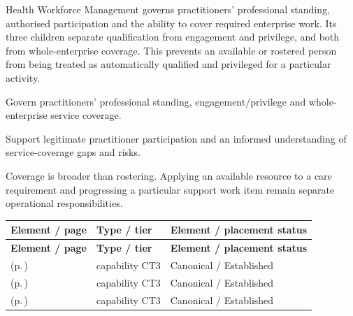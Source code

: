 Health Workforce Management governs practitioners' professional standing, authorised participation and the ability to cover required enterprise work. Its three children separate qualification from engagement and privilege, and both from whole-enterprise coverage. This prevents an available or rostered person from being treated as automatically qualified and privileged for a particular activity.



Govern practitioners’ professional standing, engagement/\allowbreak{}privilege and whole-enterprise service coverage.



Support legitimate practitioner participation and an informed understanding of service-coverage gaps and risks.



Coverage is broader than rostering. Applying an available resource to a care requirement and progressing a particular support work item remain separate operational responsibilities.


\begingroup\small\setlength{\TableWidth}{\dimexpr\linewidth-6\tabcolsep-4\arrayrulewidth\relax}
\begin{longtable}{|>{\raggedright\arraybackslash}p{0.52\TableWidth}|>{\raggedright\arraybackslash}p{0.2\TableWidth}|>{\raggedright\arraybackslash}p{0.28\TableWidth}|}
\hline\rowcolor{TableHead}\textbf{Element / page} & \textbf{Type / tier} & \textbf{Element / placement status}\\\hline\endfirsthead
\hline\rowcolor{TableHead}\textbf{Element / page} & \textbf{Type / tier} & \textbf{Element / placement status}\\\hline\endhead
\hline\endfoot
\nameref{cap:bc-practitioner-qualification-management} (p.\,\pageref{cap:bc-practitioner-qualification-management}) & capability CT3 & Canonical / Established\\\hline
\nameref{cap:bc-practitioner-engagement-privilege-management} (p.\,\pageref{cap:bc-practitioner-engagement-privilege-management}) & capability CT3 & Canonical / Established\\\hline
\nameref{cap:bc-workforce-service-coverage-management} (p.\,\pageref{cap:bc-workforce-service-coverage-management}) & capability CT3 & Canonical / Established\\\hline
\end{longtable}\endgroup

